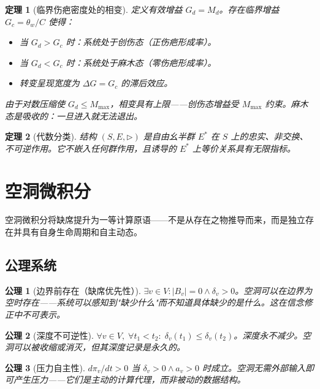 \documentclass[11pt]{article}
\newtheorem{theorem}{定理}[section]
\newtheorem{axiom}{公理}[section]
\begin{document}
\begin{theorem}[临界伤疤密度处的相变]
\label{thm:scar-phase}
定义有效增益 $G_d = M_d$。存在临界增益 $G_c = \theta_w / C$ 使得：
\begin{itemize}
\item 当 $G_d > G_c$ 时：系统处于\emph{创伤态}（正伤疤形成率）。
\item 当 $G_d < G_c$ 时：系统处于\emph{麻木态}（零伤疤形成率）。
\item 转变呈现宽度为 $\Delta G = G_c$ 的滞后效应。
\end{itemize}
由于对数压缩使 $G_d \leq M_{\max}$，相变具有上限——创伤态增益受 $M_{\max}$ 约束。麻木态是吸收的：一旦进入就无法退出。
\end{theorem}

\begin{theorem}[代数分类]
\label{thm:scar-algebra-class}
结构 $(S, E, \triangleright)$ 是自由幺半群 $E^*$ 在 $S$ 上的忠实、非交换、不可逆作用。它不嵌入任何群作用，且诱导的 $E^*$ 上等价关系具有无限指标。
\end{theorem}

\section{空洞微积分}
\label{sec:void}

空洞微积分将缺席提升为一等计算原语——不是从存在之物推导而来，而是独立存在并具有自身生命周期和自主动态。

\subsection{公理系统}

\begin{axiom}[边界前存在（缺席优先性）]
\label{ax:void-primacy}
$\exists v \in V: |B_v| = 0 \wedge \delta_v > 0$。空洞可以在边界为空时存在——系统可以感知到"缺少什么"而不知道具体缺少的是什么。这在信念修正中不可表示。
\end{axiom}

\begin{axiom}[深度不可逆性]
\label{ax:void-depth}
$\forall v \in V,\; \forall t_1 < t_2:\; \delta_v(t_1) \leq \delta_v(t_2)$。深度永不减少。空洞可以被收缩或消灭，但其深度记录是永久的。
\end{axiom}

\begin{axiom}[压力自主性]
\label{ax:void-pressure}
$d\pi_v/dt > 0$ 当 $\delta_v > 0 \wedge a_v > 0$ 时成立。空洞无需外部输入即可产生压力——它们是主动的计算代理，而非被动的数据结构。
\end{axiom}
\end{document}
